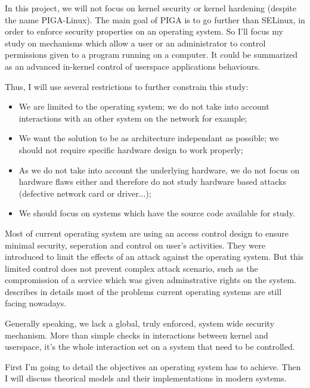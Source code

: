 \documentclass[pdftex,a4paper,titlepage,11pt]{article}
\begin{document}
\bigskip

In this project, we will not focus on kernel security or kernel hardening
(despite the name PIGA-Linux). The main goal of PIGA is to go further than
SELinux, in order to enforce security properties on an operating system. So
I'll focus my study on mechanisms which allow a user or an administrator to
control permissions given to a program running on a computer. It could be
summarized as an advanced in-kernel control of userspace applications
behaviours.

\bigskip

Thus, I will use several restrictions to further constrain this study:
\begin{itemize}
	\item We are limited to the operating system; we do not take into account
interactions with an other system on the network for example;
	\item We want the solution to be as architecture independant as possible;
we should not require specific hardware design to work properly;
	\item As we do not take into account the underlying hardware, we do not
focus on hardware flaws either and therefore do not study hardware based
attacks (defective network card or driver...);
	\item We should focus on systems which have the source code available for
study.
\end{itemize}

\smallskip

Most of current operating system are using an access control design to ensure
minimal security, seperation and control on user's activities. They were
introduced to limit the effects of an attack against the operating system. But
this limited control does not prevent complex attack scenario, such as the
compromission of a service which was given adminstrative rights on the system.
\cite{inevitabilityoffailure1998} describes in details most of the problems
current operating
systems are still facing nowadays.

\bigskip

Generally speaking, we lack a global, truly enforced, system wide security
mechanism. More than simple checks in interactions between kernel and
userspace, it's the whole interaction set on a system that need to be
controlled.

\bigskip

First I'm going to detail the objectives an operating system has to achieve.
Then I will discuss theorical models and their implementations in modern
systems.
\end{document}
